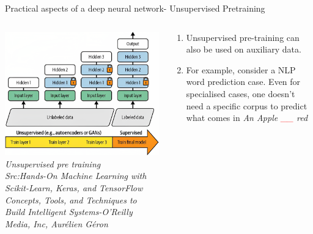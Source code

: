 \begin{frame}{Practical aspects of a deep neural network- Unsupervised Pretraining}
	\begin{columns}[T]
        \begin{column}{0.4\textwidth}
        	\includegraphics[width=\textwidth]{images/unsupervised pretraining.png}
			\tiny{\textit{Unsupervised pre training\\ Src:Hands-On Machine Learning with Scikit-Learn, Keras, and TensorFlow  Concepts, Tools, and Techniques to Build Intelligent Systems-O'Reilly Media, Inc, Aurélien Géron}}
        \end{column}
	    \begin{column}{0.6\textwidth} 
			\begin{enumerate}[$\bullet$]
				\item Unsupervised pre-training can also be used on auxiliary data.\pause
				\item For example, consider a NLP word prediction case. Even for specialised cases, one doesn't need a specific corpus to predict what comes in \textit{An Apple \textcolor{red}{\_\_} red } 
			\end{enumerate}
    	\end{column}
    \end{columns}
\end{frame}



